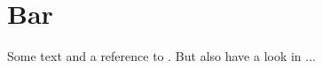 
\chapter*{Bar}
Some text and a reference to \cite{lamport94}. But also have a look in \cite{knuth79}...


